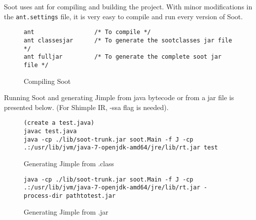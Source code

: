 \documentclass{dithesis}
\begin{document}
    Soot uses ant \cite{Apache Ant} for compiling and building the project. With minor modifications in the \texttt{ant.settings} file, it is very easy to compile and run every version of Soot.

    \begin{figure}[H]
\begin{lstlisting}
ant                 /* To compile */
ant classesjar      /* To generate the sootclasses jar file */
ant fulljar         /* To generate the complete soot jar file */
\end{lstlisting}
        \caption{Compiling Soot}
        \end{figure}

        Running Soot and generating Jimple from java bytecode or from a jar file is presented below. (For Shimple IR, -ssa flag is needed).
        \begin{figure}[H]
\begin{lstlisting}
(create a test.java)
javac test.java
java -cp ./lib/soot-trunk.jar soot.Main -f J -cp .:/usr/lib/jvm/java-7-openjdk-amd64/jre/lib/rt.jar test
\end{lstlisting}
        \caption{Generating Jimple from .class}
        \end{figure}

        \begin{figure}[H]
\begin{lstlisting}
java -cp ./lib/soot-trunk.jar soot.Main -f J -cp .:/usr/lib/jvm/java-7-openjdk-amd64/jre/lib/rt.jar -process-dir pathtotest.jar
\end{lstlisting}
        \caption{Generating Jimple from .jar}
        \end{figure}
\end{document}
